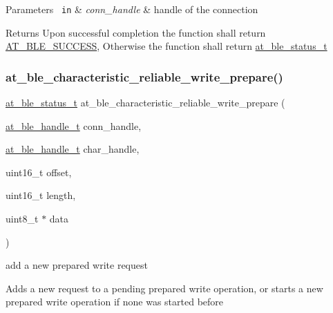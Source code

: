 \begin{DoxyParams}[1]{Parameters}
\mbox{\texttt{ in}}  & {\em conn\+\_\+handle} & handle of the connection\\
\hline
\end{DoxyParams}
\begin{DoxyReturn}{Returns}
Upon successful completion the function shall return \mbox{\hyperlink{group__error__codes__group_gga3b1db9b95feb157b3c188ca27fe76988a7e3bfff5387331cd4f2c56cbcbbd7e19}{A\+T\+\_\+\+B\+L\+E\+\_\+\+S\+U\+C\+C\+E\+SS}}, Otherwise the function shall return \mbox{\hyperlink{at__ble__api_8h_ace24eb4e5ca3f325c663b809da5feb92}{at\+\_\+ble\+\_\+status\+\_\+t}} 
\end{DoxyReturn}
\mbox{\label{group__gatt__client__group_gaeaad17e6de538db2f9db638a0fef0310}} 
\subsubsection{\texorpdfstring{at\_ble\_characteristic\_reliable\_write\_prepare()}{at\_ble\_characteristic\_reliable\_write\_prepare()}}
{\footnotesize\ttfamily \mbox{\hyperlink{group__error__codes__group_ga3b1db9b95feb157b3c188ca27fe76988}{at\+\_\+ble\+\_\+status\+\_\+t}} at\+\_\+ble\+\_\+characteristic\+\_\+reliable\+\_\+write\+\_\+prepare (\begin{DoxyParamCaption}\item[{\mbox{\hyperlink{at__ble__api_8h_abd23646d0c662860741f787efc8456f2}{at\+\_\+ble\+\_\+handle\+\_\+t}}}]{conn\+\_\+handle,  }\item[{\mbox{\hyperlink{at__ble__api_8h_abd23646d0c662860741f787efc8456f2}{at\+\_\+ble\+\_\+handle\+\_\+t}}}]{char\+\_\+handle,  }\item[{uint16\+\_\+t}]{offset,  }\item[{uint16\+\_\+t}]{length,  }\item[{uint8\+\_\+t $\ast$}]{data }\end{DoxyParamCaption})}



add a new prepared write request 

Adds a new request to a pending prepared write operation, or starts a new prepared write operation if none was started before


